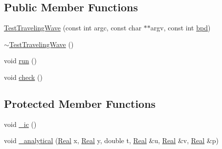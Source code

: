 \subsection*{Public Member Functions}
\begin{DoxyCompactItemize}
\item 
\hyperlink{class_test_traveling_wave_a0458a10c1df8a9cae028db0534ded8f5}{Test\+Traveling\+Wave} (const int argc, const char $\ast$$\ast$argv, const int \hyperlink{class_test_traveling_wave_a311622713a88eb93558ca2fe900f715d}{bpd})
\item 
\hyperlink{class_test_traveling_wave_a3bb52baf43bdf1e3e787623d0870fa53}{$\sim$\+Test\+Traveling\+Wave} ()
\item 
void \hyperlink{class_test_traveling_wave_a877227aae97a436f3ac05b5f0d4cd704}{run} ()
\item 
void \hyperlink{class_test_traveling_wave_a27a3322ecdfcb3c40eafa7b552cf8670}{check} ()
\end{DoxyCompactItemize}
\subsection*{Protected Member Functions}
\begin{DoxyCompactItemize}
\item 
void \hyperlink{class_test_traveling_wave_a57788d791c27a4169d785f5c507d28d6}{\+\_\+ic} ()
\item 
void \hyperlink{class_test_traveling_wave_a09479a9faa31ca4c36df8b5a5908ae5b}{\+\_\+analytical} (\hyperlink{_h_d_f5_dumper_8h_a445a5f0e2a34c9d97d69a3c2d1957907}{Real} x, \hyperlink{_h_d_f5_dumper_8h_a445a5f0e2a34c9d97d69a3c2d1957907}{Real} y, double t, \hyperlink{_h_d_f5_dumper_8h_a445a5f0e2a34c9d97d69a3c2d1957907}{Real} \&u, \hyperlink{_h_d_f5_dumper_8h_a445a5f0e2a34c9d97d69a3c2d1957907}{Real} \&v, \hyperlink{_h_d_f5_dumper_8h_a445a5f0e2a34c9d97d69a3c2d1957907}{Real} \&p)
\end{DoxyCompactItemize}
